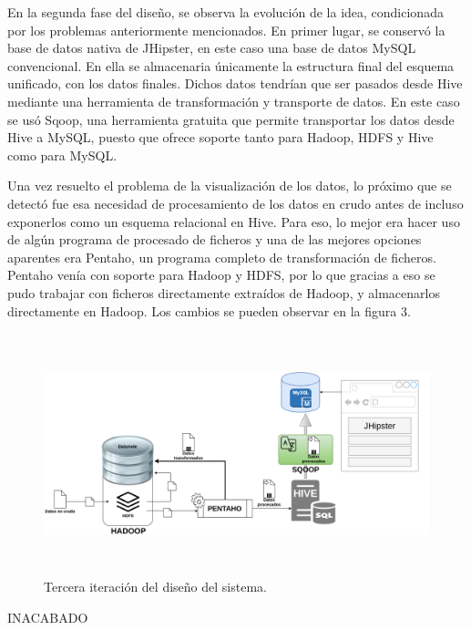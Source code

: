 En la segunda fase del diseño, se observa la evolución de la idea, condicionada por los problemas anteriormente mencionados. En primer lugar, se conservó la base de datos nativa de JHipster, en este caso una base de datos MySQL convencional. En ella se almacenaria únicamente la estructura final del esquema unificado, con los datos finales. Dichos datos tendrían que ser pasados desde Hive mediante una herramienta de transformación y transporte de datos. En este caso se usó Sqoop, una herramienta gratuita que permite transportar los datos desde Hive a MySQL, puesto que ofrece soporte tanto para Hadoop, HDFS y Hive como para MySQL. \par
Una vez resuelto el problema de la visualización de los datos, lo próximo que se detectó fue esa necesidad de procesamiento de los datos en crudo antes de incluso exponerlos como un esquema relacional en Hive. Para eso, lo mejor era hacer uso de algún programa de procesado de ficheros y una de las mejores opciones aparentes era Pentaho, un programa completo de transformación de ficheros. Pentaho venía con soporte para Hadoop y HDFS, por lo que gracias a eso se pudo trabajar con ficheros directamente extraídos de Hadoop, y almacenarlos directamente en Hadoop. Los cambios se pueden observar en la figura 3. \par


\begin{figure}[!h]
    \centering
    \includegraphics[width=1\textwidth,height=7cm]{Imagenes/Dis_Fig_3}
    \caption{Tercera iteración del diseño del sistema.}
    \label{fig:dis_2_sist}
\end{figure}
\par


INACABADO

